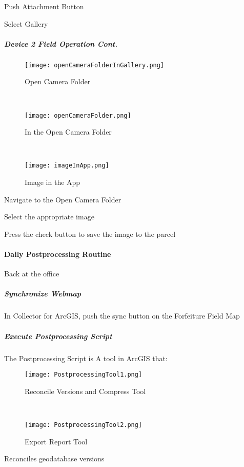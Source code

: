 \noindent Push Attachment Button
\vspace{2in}

\noindent Select Gallery
\clearpage
\subparagraph*{Device 2 Field Operation Cont.}
\begin{wrapfigure}{r}{0.4\textwidth}
\centering
    \texttt{[image: openCameraFolderInGallery.png]}
\caption {Open Camera Folder}
\vspace{.05in}

\HRule \\[.4cm] %
\vspace{.05in}

    \texttt{[image: openCameraFolder.png]}
\caption{In the Open Camera Folder}
\vspace{.1in}

\HRule \\[.4cm] %
\vspace{.05in}

    \texttt{[image: imageInApp.png]}
\caption{Image in the App}
\end{wrapfigure}
Navigate to the Open Camera Folder
\vspace{2in}

\noindent Select the appropriate image
\vspace{2in}

\noindent Press the check button to save the image to the parcel
\clearpage
\paragraph[Daily Postprocessing Routine]{Daily Postprocessing Routine\texorpdfstring{\\}{}}
Back at the office
\subparagraph[Synchronize Webmap]{Synchronize Webmap\texorpdfstring{\\}{}}
In Collector for ArcGIS, push the sync button on the Forfeiture Field Map
\subparagraph[Execute Postprocessing Script]{Execute Postprocessing Script\texorpdfstring{\\}{}}
The Postprocessing Script is A tool in ArcGIS that:
\begin{wrapfigure}{r}{0.5\textwidth}
\centering
    \texttt{[image: PostprocessingTool1.png]}
\caption{Reconcile Versions and Compress Tool}
\vspace{.25in}

\HRule \\[.4cm] %
\vspace{.25in}

    \texttt{[image: PostprocessingTool2.png]}
\caption{Export Report Tool}
\end{wrapfigure}
Reconciles geodatabase versions
\vspace{1.5in}

